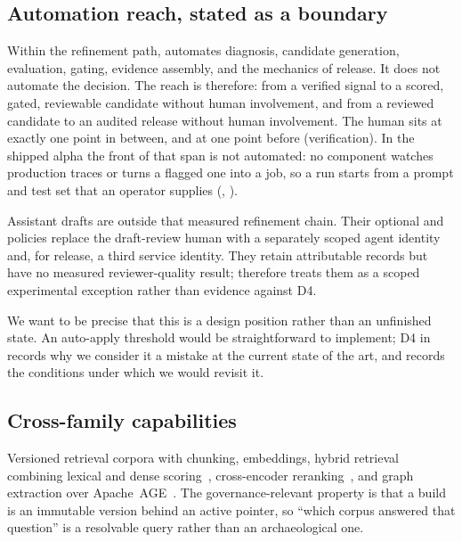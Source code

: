 \subsection{Automation reach, stated as a boundary}

Within the refinement path, \sys automates diagnosis, candidate generation, evaluation, gating, evidence
assembly, and the mechanics of release. It does not automate the decision. The
reach is therefore: from a verified signal to a scored, gated, reviewable candidate
without human involvement, and from a reviewed candidate to an audited release
without human involvement. The human sits at exactly one point in between, and at
one point before (verification). In the shipped alpha the front of that span is not
automated: no component watches production traces or turns a flagged one into a job,
so a run starts from a prompt and test set that an operator supplies
(, ).

Assistant drafts are outside that measured refinement chain. Their optional
 and  policies replace the draft-review
human with a separately scoped agent identity and, for release, a third service
identity. They retain attributable records but have no measured reviewer-quality
result;  therefore treats them as a scoped experimental
exception rather than evidence against D4.

We want to be precise that this is a design position rather than an unfinished
state. An auto-apply threshold would be straightforward to implement; D4 in
 records why we consider it a mistake at the current state of
the art, and  records the conditions under which we would revisit
it.

\subsection{Cross-family capabilities}

 Versioned retrieval corpora with chunking, embeddings,
hybrid retrieval combining lexical and dense scoring~\cite{robertson2009bm25,
lewis2020rag}, cross-encoder reranking~\cite{nogueira2019bertrerank}, and graph
extraction over Apache~AGE~\cite{apacheage}. The governance-relevant property is
that a build is an immutable version behind an active pointer, so ``which corpus
answered that question'' is a resolvable query rather than an archaeological one.

